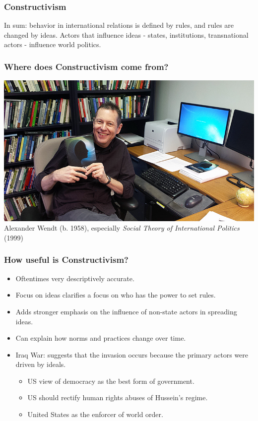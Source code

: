 \documentclass{beamer}
\begin{document}
\begin{frame} 
\frametitle{\LARGE{Constructivism}}
In sum: behavior in international relations is defined by rules, and rules are changed by ideas. Actors that  influence ideas - states, institutions, transnational actors - influence world politics. 

\end{frame}

\begin{frame} 
\frametitle{\LARGE{Where does Constructivism come from?}}
    \centering
\includegraphics[width=\textwidth,height=0.8\textheight,keepaspectratio]{wendt.jpg}
Alexander Wendt (b. 1958), especially \textit{Social Theory of International Politics} (1999)
\end{frame}

\begin{frame} 
\frametitle{\LARGE{How useful is Constructivism?}}
    \begin{itemize}
        \item Oftentimes very descriptively accurate.  \pause
        \item Focus on ideas clarifies a focus on who has the power to set rules. \pause
        \item Adds stronger emphasis on the influence of non-state actors in spreading ideas. \pause
        \item Can explain how norms and practices change over time.
        \item Iraq War: suggests that the invasion occurs because the primary actors were driven by ideals. \pause
        \begin{itemize}
            \item US view of democracy as the best form of government. \pause
            \item US should rectify human rights abuses of Hussein's regime. \pause
            \item United States as the enforcer of world order.
          \end{itemize}
      \end{itemize}
\end{frame}
\end{document}
